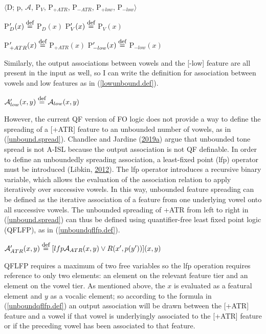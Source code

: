 \documentclass[,doc,floatsintext]{apa6}
\def\defeq{\mathrel{\buildrel \mbox{\footnotesize def} \over =}}
\theoremstyle{definition}
\theoremstyle{definition}
\theoremstyle{definition}
\theoremstyle{remark}
\begin{document}
\begin{exe}
\ex\label{dunbound.def} $\langle$D; p, $\mathcal{A}$, P$_V$, P$_{+ATR}$, P$_{-ATR}$, P$_{+low}$, P$_{-low}\rangle$ 
\end{exe}

P\('_{D}(x) \defeq\) P\(_{D}(x)\) \hspace{1.2in} P\('_{V}(x) \defeq\)
P\(_{V}(x)\)

P\('_{+ATR}(x) \defeq\) P\(_{+ATR}(x)\) \hspace{0.75in}
P\('_{-low}(x) \defeq\) P\(_{-low}(x)\) \vspace{0.25in}

\noindent Similarly, the output associations between vowels and the
{[}-low{]} feature are all present in the input as well, so I can write
the definition for association between vowels and low features as in
(\ref{lowunbound.def}).

\begin{exe}
\ex\label{lowunbound.def}
$\mathcal{A}_{low}'(x, y) \defeq \mathcal{A}_{low}(x, y)$
\end{exe}

However, the current QF version of FO logic does not provide a way to
define the spreading of a {[}+ATR{]} feature to an unbounded number of
vowels, as in (\ref{unbound.spread}). Chandlee and Jardine
(\protect\hyperlink{ref-chandleejardineaisl}{2019}\protect\hyperlink{ref-chandleejardineaisl}{a})
argue that unbounded tone spread is not A-ISL because the output
association is not QF definable. In order to define an unboundedly
spreading association, a least-fixed point (lfp) operator must be
introduced (Libkin, \protect\hyperlink{ref-libkin2012}{2012}). The lfp
operator introduces a recursive binary variable, which allows the
evaluation of the association relation to apply iteratively over
successive vowels. In this way, unbounded feature spreading can be
defined as the iterative association of a feature from one underlying
vowel onto all successive vowels. The unbounded spreading of +ATR from
left to right in (\ref{unbound.spread}) can thus be defined using
quantifier-free least fixed point logic (QFLFP), as in
(\ref{unboundqflfp.def}).

\begin{exe}
\ex\label{unboundqflfp.def}
$\mathcal{A}_{ATR}'(x, y) \defeq [lfp \mathcal{A}_{ATR}(x, y)\vee R(x', p(y'))](x, y)$
\end{exe}

\noindent QFLFP requires a maximum of two free variables so the lfp
operation requires reference to only two elements: an element on the
relevant feature tier and an element on the vowel tier. As mentioned
above, the \(x\) is evaluated as a featural element and \(y\) as a
vocalic element; so according to the formula in (\ref{unboundqflfp.def})
an output association will be drawn between the {[}+ATR{]} feature and a
vowel if that vowel is underlyingly associated to the {[}+ATR{]} feature
or if the preceding vowel has been associated to that feature.
\end{document}
